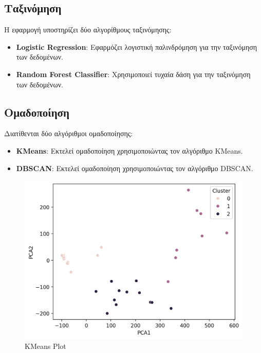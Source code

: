 \documentclass{article}
\begin{document}
\subsection{Ταξινόμηση}
Η εφαρμογή υποστηρίζει δύο αλγορίθμους ταξινόμησης:
\begin{itemize}
    \item \textbf{Logistic Regression}: Εφαρμόζει λογιστική παλινδρόμηση για την ταξινόμηση των δεδομένων.
    \item \textbf{Random Forest Classifier}: Χρησιμοποιεί τυχαία δάση για την ταξινόμηση των δεδομένων.
\end{itemize}

\subsection{Ομαδοποίηση}
Διατίθενται δύο αλγόριθμοι ομαδοποίησης:
\begin{itemize}
    \item \textbf{KMeans}: Εκτελεί ομαδοποίηση χρησιμοποιώντας τον αλγόριθμο KMeans.
    \item \textbf{DBSCAN}: Εκτελεί ομαδοποίηση χρησιμοποιώντας τον αλγόριθμο DBSCAN.
\end{itemize}

\begin{figure}[h!]
    \centering
    \includegraphics[width=\textwidth]{kmeans_plot.png}
    \caption{KMeans Plot}
    \label{fig:kmeans}
\end{figure}
\end{document}
